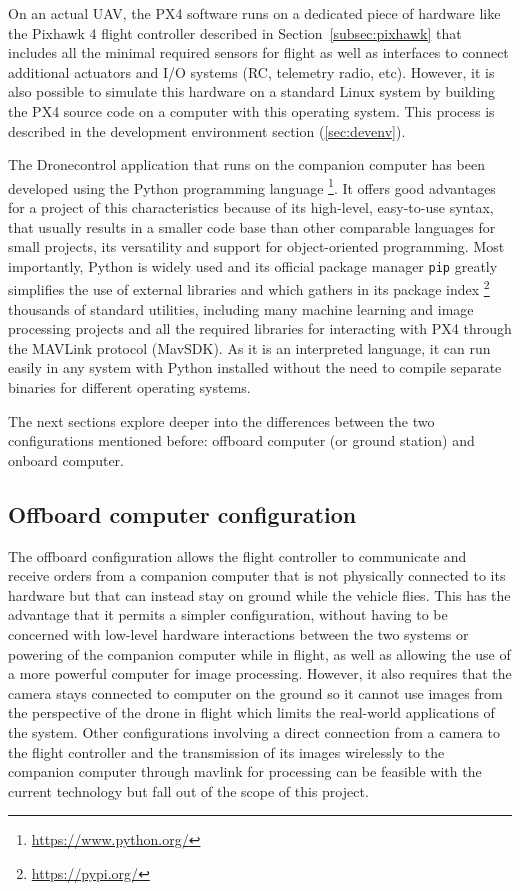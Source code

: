 On an actual UAV, the PX4 software runs on a dedicated piece of hardware like the Pixhawk 4 flight controller described in Section~\ref{subsec:pixhawk} that includes all the minimal required sensors for flight as well as interfaces to connect additional actuators and I/O systems (RC, telemetry radio, etc).
However, it is also possible to simulate this hardware on a standard Linux system by building the PX4 source code on a computer with this operating system.
This process is described in the development environment section (\ref{sec:devenv}).

The Dronecontrol application that runs on the companion computer has been developed using the Python programming language \footnote{\url{https://www.python.org/}}.
It offers good advantages for a project of this characteristics because of its high-level,
easy-to-use syntax, that usually results in a smaller code base than other comparable languages for small projects, its versatility and support for object-oriented programming. 
Most importantly, Python is widely used and its official package manager \verb|pip| greatly simplifies the use of external libraries and which gathers in its package index \footnote{\url{https://pypi.org/}} thousands of standard utilities,
including many machine learning and image processing projects and all the required libraries for interacting with PX4 through the MAVLink protocol (MavSDK).
As it is an interpreted language, it can run easily in any system with Python installed without the need to compile separate binaries for different operating systems.

The next sections explore deeper into the differences between the two configurations mentioned before: offboard computer (or ground station) and onboard computer.

\subsection{Offboard computer configuration}
\label{subsec:offboard}

The offboard configuration allows the flight controller to communicate and receive orders from a companion computer that is not physically connected to its hardware but that can instead stay on ground while the vehicle flies.
This has the advantage that it permits a simpler configuration, without having to be concerned with low-level hardware interactions between the two systems or powering of the companion computer while in flight, as well as allowing the use of a more powerful computer for image processing.
However, it also requires that the camera stays connected to computer on the ground so it cannot use images from the perspective of the drone in flight which limits the real-world applications of the system.
Other configurations involving a direct connection from a camera to the flight controller and the transmission of its images wirelessly to the companion computer through mavlink for processing can be feasible with the current technology but fall out of the scope of this project.

